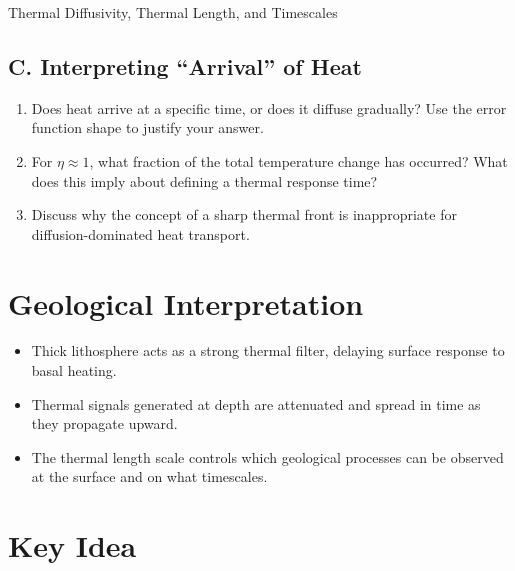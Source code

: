 \begin{activity}{Thermal Diffusivity, Thermal Length, and Timescales}
\subsection*{C. Interpreting ``Arrival'' of Heat}
\begin{enumerate}
  \item Does heat arrive at a specific time, or does it diffuse gradually?
  Use the error function shape to justify your answer.
  \answerbox[2cm]

  \item For $\eta \approx 1$, what fraction of the total temperature change has
  occurred? What does this imply about defining a thermal response time?
  \answerbox[2cm]

  \item Discuss why the concept of a sharp thermal front is inappropriate for
  diffusion-dominated heat transport.
  \answerbox[2cm]
\end{enumerate}

\section*{Geological Interpretation}

\begin{itemize}
  \item Thick lithosphere acts as a strong thermal filter, delaying surface
  response to basal heating.
  \item Thermal signals generated at depth are attenuated and spread in time as
  they propagate upward.
  \item The thermal length scale controls which geological processes can be
  observed at the surface and on what timescales.
\end{itemize}

\section*{Key Idea}

\vspace{0.5em}

\noindent
{}

{\color{blue}
\begin{figure}[h]
\centering
{}
\end{figure}}
\end{activity}
